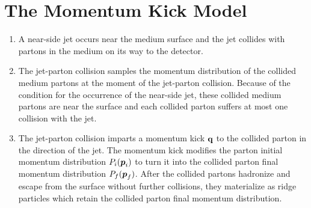 \documentclass[showpacs,preprintnumbers,amsmath,amssymb,floatfix]{revtex4}
\begin{document}
\section{The Momentum Kick Model}


\begin{enumerate}

\item
A near-side jet occurs near the medium surface and the jet collides
with partons in the medium on its way to the detector.

\item
The jet-parton collision samples the momentum distribution of the
collided medium partons at the moment of the jet-parton collision.
Because of the condition for the occurrence of the near-side jet,
these collided medium partons are near the surface and each collided
parton suffers at most one collision with the jet.

\item
The jet-parton collision imparts a momentum kick ${\bf q}$ to the
collided parton in the direction of the jet.  The momentum kick
modifies the parton initial momentum distribution $P_i(\hbox{\boldmath${p}$}_i)$ to
turn it into the collided parton final momentum distribution
$P_f(\hbox{\boldmath${p}$}_f)$.  After the collided partons hadronize and escape
from the surface without further collisions, they materialize as ridge
particles which retain the collided parton final momentum
distribution.

\end{enumerate}
\end{document}
